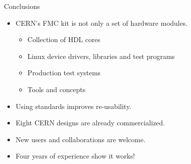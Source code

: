 \documentclass[compress,red]{beamer}
\begin{document}
\begin{frame}{Conclusions}

  \begin{block}{}
    \begin{itemize}
    \item CERN's FMC kit is not only a set of hardware modules.
      \begin{itemize}
      \item Collection of HDL cores
      \item Linux device drivers, libraries and test programs
      \item Production test systems
      \item Tools and concepts %
       \end{itemize}
    \item Using standards improves re-usability. %
    \item Eight CERN designs are already commercialized.
    \item New users and collaborations are welcome.
    \item Four years of experience show it works!

    \end{itemize}
  \end{block}

  \note[item]{}

\end{frame}
\end{document}
